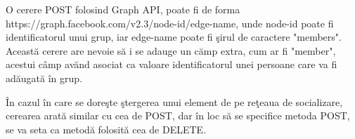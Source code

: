 	O cerere POST folosind Graph API, poate fi de forma https://graph.facebook.com/v2.3/{node-id}/{edge-name}, unde node-id poate fi identificatorul unui grup, iar edge-name poate fi \c{s}irul de caractere "members". Aceast\u{a} cerere are nevoie s\u{a} i se adauge un c\u{a}mp extra, cum ar fi "member", acestui c\^{a}mp av\u{a}nd asociat ca valoare identificatorul unei persoane care va fi ad\u{a}ugat\u{a} \^{i}n grup. 
	
	\^{I}n cazul \^{i}n care se dore\c{s}te \c{s}tergerea unui element de pe re\c{t}eaua de socializare, cerearea arat\u{a} similar cu cea de POST, dar \^{i}n loc s\u{a} se specifice metoda POST, se va seta ca metod\u{a} folosit\u{a} cea de DELETE.




